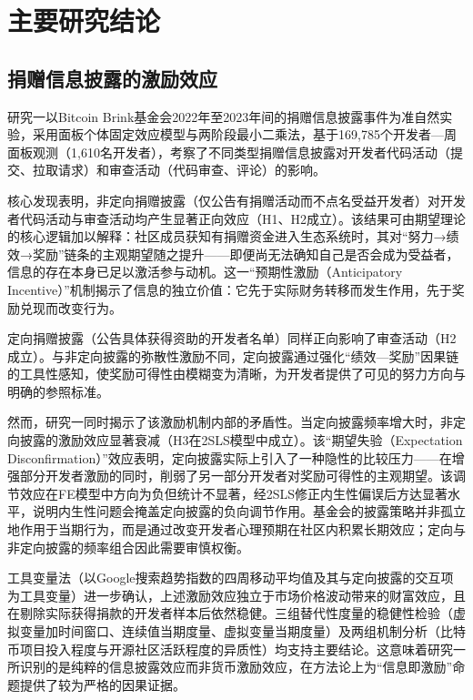 \documentclass[
    type = master, %
    degree = professional,        %
    decl-page,  %
    twoside,                %
    fontset = fandol %
  ]{njuthesis}
\begin{document}
\section{主要研究结论}

\subsection{捐赠信息披露的激励效应}

研究一以Bitcoin Brink基金会2022年至2023年间的捐赠信息披露事件为准自然实验，采用面板个体固定效应模型与两阶段最小二乘法，基于169,785个开发者—周面板观测（1,610名开发者），考察了不同类型捐赠信息披露对开发者代码活动（提交、拉取请求）和审查活动（代码审查、评论）的影响。

核心发现表明，非定向捐赠披露（仅公告有捐赠活动而不点名受益开发者）对开发者代码活动与审查活动均产生显著正向效应（H1、H2成立）。该结果可由期望理论的核心逻辑加以解释：社区成员获知有捐赠资金进入生态系统时，其对“努力→绩效→奖励”链条的主观期望随之提升——即便尚无法确知自己是否会成为受益者，信息的存在本身已足以激活参与动机。这一“预期性激励（Anticipatory Incentive）”机制揭示了信息的独立价值：它先于实际财务转移而发生作用，先于奖励兑现而改变行为。

定向捐赠披露（公告具体获得资助的开发者名单）同样正向影响了审查活动（H2成立）。与非定向披露的弥散性激励不同，定向披露通过强化“绩效—奖励”因果链的工具性感知，使奖励可得性由模糊变为清晰，为开发者提供了可见的努力方向与明确的参照标准。

然而，研究一同时揭示了该激励机制内部的矛盾性。当定向披露频率增大时，非定向披露的激励效应显著衰减（H3在2SLS模型中成立）。该“期望失验（Expectation Disconfirmation）”效应表明，定向披露实际上引入了一种隐性的比较压力——在增强部分开发者激励的同时，削弱了另一部分开发者对奖励可得性的主观期望。该调节效应在FE模型中方向为负但统计不显著，经2SLS修正内生性偏误后方达显著水平，说明内生性问题会掩盖定向披露的负向调节作用。基金会的披露策略并非孤立地作用于当期行为，而是通过改变开发者心理预期在社区内积累长期效应；定向与非定向披露的频率组合因此需要审慎权衡。

工具变量法（以Google搜索趋势指数的四周移动平均值及其与定向披露的交互项为工具变量）进一步确认，上述激励效应独立于市场价格波动带来的财富效应，且在剔除实际获得捐款的开发者样本后依然稳健。三组替代性度量的稳健性检验（虚拟变量加时间窗口、连续值当期度量、虚拟变量当期度量）及两组机制分析（比特币项目投入程度与开源社区活跃程度的异质性）均支持主要结论。这意味着研究一所识别的是纯粹的信息披露效应而非货币激励效应，在方法论上为“信息即激励”命题提供了较为严格的因果证据。
\end{document}
